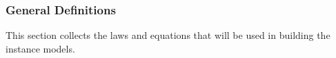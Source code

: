 \documentclass[12pt]{article}
\newcommand{\gdref}[1]{GD\ref{#1}}
\newcounter{theorynum} %
\newcommand{\tmref}[1]{TM\ref{#1}}
\newcommand{\aref}[1]{A\ref{#1}}
\newcommand{\deftheory}[9][Not Applicable]
{
  \vspace{-2mm}
\noindent \rule{\textwidth}{0.5mm}
\paragraph{Number: } TM\refstepcounter{theorynum}\thetheorynum
\phantomsection \label{#2}

\paragraph{Label:} #3

\noindent \rule{\textwidth}{0.5mm}

\paragraph{Equation:}

#4

\paragraph{Description:}

#5

\paragraph{Notes:}

#6

\paragraph{Source:}

#7

\paragraph{Ref.\ By:}

#8

\paragraph{Derivation for \tmref{#2}:}

#9

\noindent \rule{\textwidth}{0.5mm}

}
\begin{document}

\newpage

\subsubsection{General Definitions}\label{sec_gendef}


This section collects the laws and equations that will be used in building the
instance models.

\end{document}
